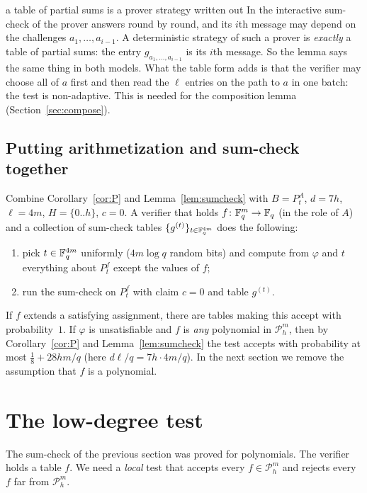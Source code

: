 \begin{pitfall}{a table of partial sums is a prover strategy written out}
In the interactive sum-check of \citet{LFKN92} the prover answers round by round, and its $i$th message may depend on the challenges $a_1,\dots,a_{i-1}$.  A deterministic strategy of such a prover is
\emph{exactly} a table of partial sums: the entry $g_{a_1,\dots,a_{i-1}}$ is its $i$th message.  So the lemma says the same thing in both models.  What the table form adds is that the verifier
may choose all of $a$ first and then read the $\ell$ entries on the path to $a$ in one batch: the test is non-adaptive.  This is needed for the composition lemma (Section~\ref{sec:compose}).
\end{pitfall}

\subsection{Putting arithmetization and sum-check together}

Combine Corollary~\ref{cor:P} and Lemma~\ref{lem:sumcheck} with $B=P^A_t$, $d=7h$, $\ell=4m$, $H=\{0..h\}$, $c=0$.  A verifier that holds $f\colon\mathbb{F}_q^m\to\mathbb{F}_q$ (in the role of $A$)
and a collection of sum-check tables $\{g^{(t)}\}_{t\in\mathbb{F}_q^{4m}}$ does the following:
\begin{enumerate}
  \item pick $t\in\mathbb{F}_q^{4m}$ uniformly ($4m\log q$ random bits) and compute from $\varphi$ and $t$ everything about $P^f_t$ except the values of $f$;
  \item run the sum-check on $P^f_t$ with claim $c=0$ and table $g^{(t)}$.
\end{enumerate}
If $f$ extends a satisfying assignment, there are tables making this accept with probability~$1$.  If $\varphi$ is unsatisfiable and $f$ is \emph{any} polynomial in $\mathcal P^m_h$, then by
Corollary~\ref{cor:P} and Lemma~\ref{lem:sumcheck} the test accepts with probability at most $\tfrac18+28hm/q$ (here $d\ell/q=7h\cdot4m/q$).  In the next section we remove the assumption that $f$ is a polynomial.


\section{The low-degree test}
\label{sec:ldt}

The sum-check of the previous section was proved for polynomials.  The verifier holds a table $f$.  We need a \emph{local} test that accepts every
$f\in\mathcal P^m_h$ and rejects every $f$ far from $\mathcal P^m_h$.

